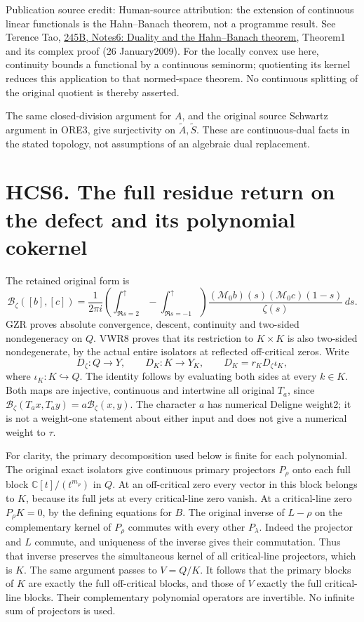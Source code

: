 Publication source credit: Human-source attribution: the extension of
continuous linear functionals is the Hahn--Banach theorem, not a
programme result. See Terence Tao,
\href{https://terrytao.wordpress.com/2009/01/26/245b-notes-6-duality-and-the-hahn-banach-theorem/}{245B,
Notes6: Duality and the Hahn--Banach theorem}, Theorem1 and its complex
proof (26 January2009). For the locally convex use here, continuity
bounds a functional by a continuous seminorm; quotienting its kernel
reduces this application to that normed-space theorem. No continuous
splitting of the original quotient is thereby asserted.

The same closed-division argument for \(A\), and the original source
Schwartz argument in ORE3, give surjectivity on
\(\widetilde A,\widetilde S\). These are continuous-dual facts in the
stated topology, not assumptions of an algebraic dual replacement.

\section{HCS6. The full residue return on the defect and its polynomial
cokernel}\label{hcs6.-the-full-residue-return-on-the-defect-and-its-polynomial-cokernel}

The retained original form is \[
\mathcal B_\zeta([b],[c])=
\frac1{2\pi i}
\left(\int_{\Re s=2}^{\uparrow}
-\int_{\Re s=-1}^{\uparrow}\right)
\frac{(\mathcal M_0b)(s)(\mathcal M_0c)(1-s)}{\zeta(s)}\,ds.
\tag{HCS6.1}
\] GZR proves absolute convergence, descent, continuity and two-sided
nondegeneracy on \(Q\). VWR8 proves that its restriction to
\(K\times K\) is also two-sided nondegenerate, by the actual entire
isolators at reflected off-critical zeros. Write \[
D_\zeta:Q\to Y,\qquad
D_K:K\to Y_K,\qquad
\boxed{D_K=r_KD_\zeta\iota_K,}
\tag{HCS6.2}
\] where \(\iota_K:K\hookrightarrow Q\). The identity follows by
evaluating both sides at every \(k\in K\). Both maps are injective,
continuous and intertwine all original \(T_a\), since
\(\mathcal B_\zeta(T_ax,T_ay)=a\mathcal B_\zeta(x,y)\). The character
\(a\) has numerical Deligne weight2; it is not a weight-one statement
about either input and does not give a numerical weight to \(\tau\).

For clarity, the primary decomposition used below is finite for each
polynomial. The original exact isolators give continuous primary
projectors \(P_\rho\) onto each full block \(\mathbb C[t]/(t^{m_\rho})\)
in \(Q\). At an off-critical zero every vector in this block belongs to
\(K\), because its full jets at every critical-line zero vanish. At a
critical-line zero \(P_\rho K=0\), by the defining equations for \(B\).
The original inverse of \(L-\rho\) on the complementary kernel of
\(P_\rho\) commutes with every other \(P_\lambda\). Indeed the projector
and \(L\) commute, and uniqueness of the inverse gives their
commutation. Thus that inverse preserves the simultaneous kernel of all
critical-line projectors, which is \(K\). The same argument passes to
\(V=Q/K\). It follows that the primary blocks of \(K\) are exactly the
full off-critical blocks, and those of \(V\) exactly the full
critical-line blocks. Their complementary polynomial operators are
invertible. No infinite sum of projectors is used.

